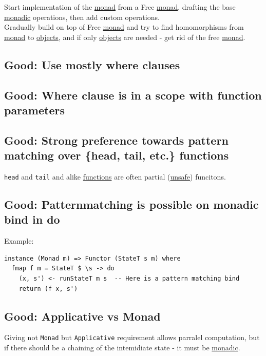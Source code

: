 \documentclass[11pt]{article}
\begin{document}
Start implementation of the \hyperref[org268aaf1]{monad} from a Free \hyperref[org268aaf1]{monad}, drafting the base \hyperref[org5cc37ea]{monadic} operations, then add custom operations.\\

Gradually build on top of Free \hyperref[org268aaf1]{monad} and try to find homomorphisms from \hyperref[org268aaf1]{monad} to \hyperref[orge0f000f]{objects}, and if only \hyperref[orge0f000f]{objects} are needed - get rid of the free \hyperref[org268aaf1]{monad}.\\

\subsection{\label{org69f449f}Good: Use mostly where clauses}
\label{sec:org03c119b}

\subsection{\label{org05c0c76}Good: Where clause is in a scope with function parameters}
\label{sec:orgb13a9f3}

\subsection{\label{org17d313e}Good: Strong preference towards pattern matching over \{head, tail, etc.\} functions}
\label{sec:org0718c50}
\texttt{head} and \texttt{tail} and alike \hyperref[org66c5288]{functions} are often partial (\hyperref[org76b942a]{unsafe}) funcitons.\\

\subsection{\label{orgfc56466}Good: Patternmatching is possible on monadic bind in do}
\label{sec:org9489add}
Example:\\
\begin{verbatim}
instance (Monad m) => Functor (StateT s m) where
  fmap f m = StateT $ \s -> do
    (x, s') <- runStateT m s  -- Here is a pattern matching bind
    return (f x, s')
\end{verbatim}
\subsection{\label{orga9e8ede}Good: Applicative vs Monad}
\label{sec:org8a567e9}
Giving not \texttt{Monad} but \texttt{Applicative} requirement allows parralel computation, but if there should be a chaining of the intemidiate state - it must be \hyperref[org5cc37ea]{monadic}.\\
\end{document}
